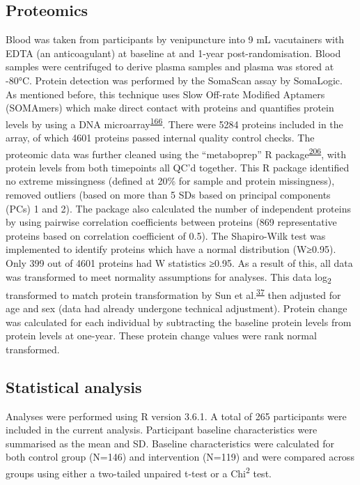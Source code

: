 \documentclass[11pt,twoside]{bristolthesis}
\begin{document}
\hypertarget{proteomics}{%
\subsection{Proteomics}\label{proteomics}}

Blood was taken from participants by venipuncture into 9 mL vacutainers with EDTA (an anticoagulant) at baseline at and 1-year post-randomisation. Blood samples were centrifuged to derive plasma samples and plasma was stored at -80°C. Protein detection was performed by the SomaScan assay by SomaLogic. As mentioned before, this technique uses Slow Off-rate Modified Aptamers (SOMAmers) which make direct contact with proteins and quantifies protein levels by using a DNA microarray\textsuperscript{\protect\hyperlink{ref-Rohloff2014}{166}}. There were 5284 proteins included in the array, of which 4601 proteins passed internal quality control checks. The proteomic data was further cleaned using the ``metaboprep'' R package\textsuperscript{\protect\hyperlink{ref-Hughes2021}{206}}, with protein levels from both timepoints all QC'd together. This R package identified no extreme missingness (defined at 20\% for sample and protein missingness), removed outliers (based on more than 5 SDs based on principal components (PCs) 1 and 2). The package also calculated the number of independent proteins by using pairwise correlation coefficients between proteins (869 representative proteins based on correlation coefficient of 0.5). The Shapiro-Wilk test was implemented to identify proteins which have a normal distribution (W≥0.95). Only 399 out of 4601 proteins had W statistics ≥0.95. As a result of this, all data was transformed to meet normality assumptions for analyses. This data log\textsubscript{2} transformed to match protein transformation by Sun et al.\textsuperscript{\protect\hyperlink{ref-Sun2018}{37}} then adjusted for age and sex (data had already undergone technical adjustment). Protein change was calculated for each individual by subtracting the baseline protein levels from protein levels at one-year. These protein change values were rank normal transformed.

\hypertarget{statistical-analysis-1}{%
\subsection{Statistical analysis}\label{statistical-analysis-1}}

Analyses were performed using R version 3.6.1. A total of 265 participants were included in the current analysis. Participant baseline characteristics were summarised as the mean and SD. Baseline characteristics were calculated for both control group (N=146) and intervention (N=119) and were compared across groups using either a two-tailed unpaired t-test or a Chi\textsuperscript{2} test.
\end{document}
